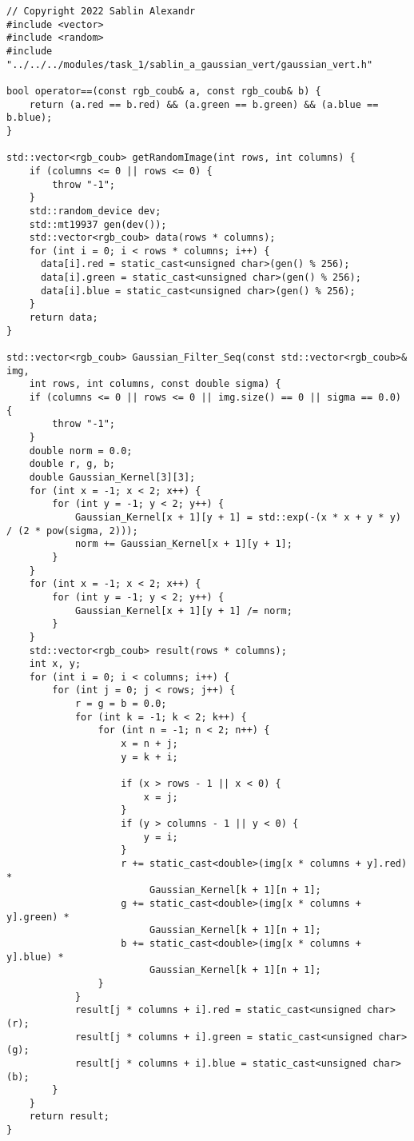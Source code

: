 \documentclass{report}
\begin{document}
\begin{lstlisting}
// Copyright 2022 Sablin Alexandr
#include <vector>
#include <random>
#include "../../../modules/task_1/sablin_a_gaussian_vert/gaussian_vert.h"

bool operator==(const rgb_coub& a, const rgb_coub& b) {
    return (a.red == b.red) && (a.green == b.green) && (a.blue == b.blue);
}

std::vector<rgb_coub> getRandomImage(int rows, int columns) {
    if (columns <= 0 || rows <= 0) {
        throw "-1";
    }
    std::random_device dev;
    std::mt19937 gen(dev());
    std::vector<rgb_coub> data(rows * columns);
    for (int i = 0; i < rows * columns; i++) {
      data[i].red = static_cast<unsigned char>(gen() % 256);
      data[i].green = static_cast<unsigned char>(gen() % 256);
      data[i].blue = static_cast<unsigned char>(gen() % 256);
    }
    return data;
}

std::vector<rgb_coub> Gaussian_Filter_Seq(const std::vector<rgb_coub>& img,
    int rows, int columns, const double sigma) {
    if (columns <= 0 || rows <= 0 || img.size() == 0 || sigma == 0.0) {
        throw "-1";
    }
    double norm = 0.0;
    double r, g, b;
    double Gaussian_Kernel[3][3];
    for (int x = -1; x < 2; x++) {
        for (int y = -1; y < 2; y++) {
            Gaussian_Kernel[x + 1][y + 1] = std::exp(-(x * x + y * y) / (2 * pow(sigma, 2)));
            norm += Gaussian_Kernel[x + 1][y + 1];
        }
    }
    for (int x = -1; x < 2; x++) {
        for (int y = -1; y < 2; y++) {
            Gaussian_Kernel[x + 1][y + 1] /= norm;
        }
    }
    std::vector<rgb_coub> result(rows * columns);
    int x, y;
    for (int i = 0; i < columns; i++) {
        for (int j = 0; j < rows; j++) {
            r = g = b = 0.0;
            for (int k = -1; k < 2; k++) {
                for (int n = -1; n < 2; n++) {
                    x = n + j;
                    y = k + i;

                    if (x > rows - 1 || x < 0) {
                        x = j;
                    }
                    if (y > columns - 1 || y < 0) {
                        y = i;
                    }
                    r += static_cast<double>(img[x * columns + y].red) *
                         Gaussian_Kernel[k + 1][n + 1];
                    g += static_cast<double>(img[x * columns + y].green) *
                         Gaussian_Kernel[k + 1][n + 1];
                    b += static_cast<double>(img[x * columns + y].blue) *
                         Gaussian_Kernel[k + 1][n + 1];
                }
            }
            result[j * columns + i].red = static_cast<unsigned char>(r);
            result[j * columns + i].green = static_cast<unsigned char>(g);
            result[j * columns + i].blue = static_cast<unsigned char>(b);
        }
    }
    return result;
}
\end{lstlisting}
\end{document}
